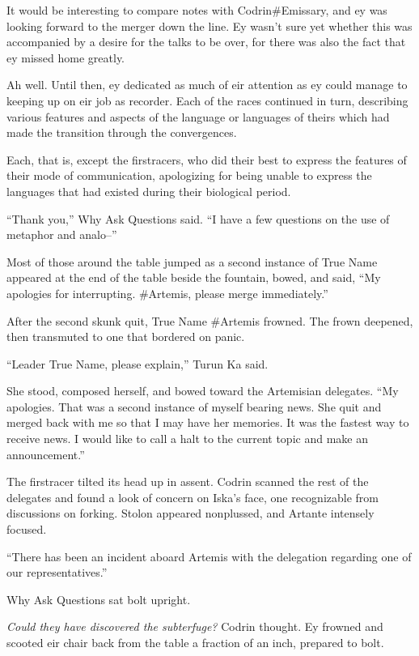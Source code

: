 It would be interesting to compare notes with Codrin\#Emissary, and ey was looking forward to the merger down the line. Ey wasn't sure yet whether this was accompanied by a desire for the talks to be over, for there was also the fact that ey missed home greatly.

Ah well. Until then, ey dedicated as much of eir attention as ey could manage to keeping up on eir job as recorder. Each of the races continued in turn, describing various features and aspects of the language or languages of theirs which had made the transition through the convergences.

Each, that is, except the firstracers, who did their best to express the features of their mode of communication, apologizing for being unable to express the languages that had existed during their biological period.

``Thank you,'' Why Ask Questions said. ``I have a few questions on the use of metaphor and analo--''

Most of those around the table jumped as a second instance of True Name appeared at the end of the table beside the fountain, bowed, and said, ``My apologies for interrupting. \#Artemis, please merge immediately.''

After the second skunk quit, True Name \#Artemis frowned. The frown deepened, then transmuted to one that bordered on panic.

``Leader True Name, please explain,'' Turun Ka said.

She stood, composed herself, and bowed toward the Artemisian delegates. ``My apologies. That was a second instance of myself bearing news. She quit and merged back with me so that I may have her memories. It was the fastest way to receive news. I would like to call a halt to the current topic and make an announcement.''

The firstracer tilted its head up in assent. Codrin scanned the rest of the delegates and found a look of concern on Iska's face, one recognizable from discussions on forking. Stolon appeared nonplussed, and Artante intensely focused.

``There has been an incident aboard Artemis with the delegation regarding one of our representatives.''

Why Ask Questions sat bolt upright.

\emph{Could they have discovered the subterfuge?} Codrin thought. Ey frowned and scooted eir chair back from the table a fraction of an inch, prepared to bolt.

